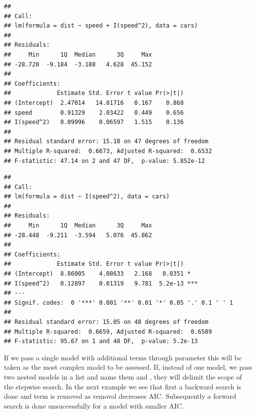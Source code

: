 \documentclass[krantz2]{krantz}\usepackage{knitr}
\begin{document}
\begin{knitrout}\footnotesize
{}\color{fgcolor}\begin{kframe}
\begin{alltt}
\end{alltt}
\begin{verbatim}
## 
## Call:
## lm(formula = dist ~ speed + I(speed^2), data = cars)
## 
## Residuals:
##     Min      1Q  Median      3Q     Max 
## -28.720  -9.184  -3.188   4.628  45.152 
## 
## Coefficients:
##             Estimate Std. Error t value Pr(>|t|)
## (Intercept)  2.47014   14.81716   0.167    0.868
## speed        0.91329    2.03422   0.449    0.656
## I(speed^2)   0.09996    0.06597   1.515    0.136
## 
## Residual standard error: 15.18 on 47 degrees of freedom
## Multiple R-squared:  0.6673,	Adjusted R-squared:  0.6532 
## F-statistic: 47.14 on 2 and 47 DF,  p-value: 5.852e-12
\end{verbatim}
\begin{alltt}
\end{alltt}
\begin{verbatim}
## 
## Call:
## lm(formula = dist ~ I(speed^2), data = cars)
## 
## Residuals:
##     Min      1Q  Median      3Q     Max 
## -28.448  -9.211  -3.594   5.076  45.862 
## 
## Coefficients:
##             Estimate Std. Error t value Pr(>|t|)    
## (Intercept)  8.86005    4.08633   2.168   0.0351 *  
## I(speed^2)   0.12897    0.01319   9.781  5.2e-13 ***
## ---
## Signif. codes:  0 '***' 0.001 '**' 0.01 '*' 0.05 '.' 0.1 ' ' 1
## 
## Residual standard error: 15.05 on 48 degrees of freedom
## Multiple R-squared:  0.6659,	Adjusted R-squared:  0.6589 
## F-statistic: 95.67 on 1 and 48 DF,  p-value: 5.2e-13
\end{verbatim}
\end{kframe}
\end{knitrout}

If we pass a single model with additional terms through parameter  this will be taken as the most complex model to be assessed. If, instead of one model, we pass two nested models in a list and name them  and , they will delimit the scope of the stepwise search. In the next example we see that first a backward search is done and term  is removed as removal decreases AIC. Subsequently a forward search is done unsuccessfully for a model with smaller AIC.
\end{document}
